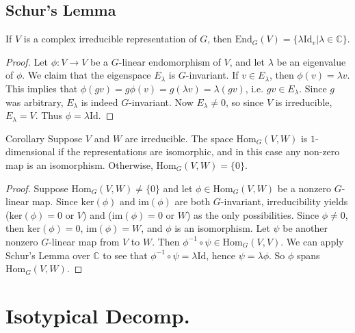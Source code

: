 \subsection{Schur's Lemma}
\begin{frame}
\begin{theorem} If $V$ is a complex irreducible representation of $G$, then $\text{End}_G(V) = \{ \lambda \text{Id}_v \vert \lambda \in \mathbb{C} \}$.
\end{theorem}
\begin{proof}
Let $\phi \colon V \to V$  be a $G$-linear endomorphism of $V$, and let $\lambda$ be an eigenvalue of $\phi$.  We claim that the eigenspace $E_\lambda$ is $G$-invariant. If $v \in E_\lambda$, then $\phi(v) = \lambda v$.  This implies that $\phi(g v) = g \phi(v) = g (\lambda v) = \lambda (gv)$, i.e. $gv \in E_\lambda$. Since $g$ was arbitrary, $E_\lambda$ is indeed $G$-invariant.  Now $E_\lambda \neq 0$, so since $V$ is irreducible, $E_\lambda = V$.  Thus $\phi = \lambda \text{Id}$.  
\end{proof}
\end{frame}

\begin{frame}
\begin{block}{Corollary}
Suppose $V$ and $W$ are irreducible. The space $\text{Hom}_G(V,W)$ is $1$-dimensional if the representations are isomorphic, and in this case any non-zero map is an isomorphism. Otherwise,  $\text{Hom}_G(V,W)=\{0\}$.
\end{block}
\begin{proof}
Suppose  $\text{Hom}_G(V,W) \neq \{0\}$ and let $\phi \in \text{Hom}_G(V,W)$ be a nonzero $G$-linear map. Since $\text{ker}(\phi)$ and $\text{im}(\phi)$ are both $G$-invariant, irreducibility yields ($\text{ker}(\phi) = 0$ or $V$) and ($\text{im}(\phi) = 0$ or $W$) as the only possibilities.  Since $\phi \neq 0$, then $\text{ker}(\phi)=0$, $\text{im}(\phi)=W$, and $\phi$ is an isomorphism.  
Let $\psi$ be another nonzero $G$-linear map from $V$ to $W$.  Then $\phi ^{-1} \circ \psi \in \text{Hom}_G (V,V)$.  We can apply Schur's Lemma over $\mathbb{C}$ to see that $\phi ^{-1} \circ \psi = \lambda \text{Id}$, hence $\psi = \lambda \phi$.  So $\phi$ spans $\text{Hom}_G(V,W)$.
\end{proof}
\end{frame}

\section{Isotypical Decomp.}
